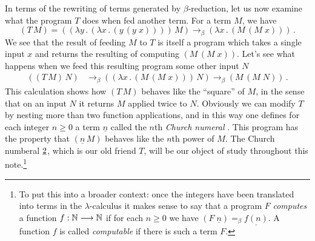 \documentclass[english,letter paper,12pt,reqno]{article}
\theoremstyle{example}
\numberwithin{equation}{section}
\begin{document}
In terms of the rewriting of terms generated by $\beta$-reduction, let us now examine what the program $T$ does when fed another term. For a term $M$, we have
\begin{equation}\label{eq:beta_reduc_dup}
(T \, M) = (( \lambda y \,.\, ( \lambda x \,.\, (y \,(y \; x))))\, M) \longrightarrow_\beta (\lambda x \, . \, (M \, (M \; x)))\,.
\end{equation}
We see that the result of feeding $M$ to $T$ is itself a program which takes a single input $x$ and returns the resulting of computing $(M \, (M \; x))$. Let's see what happens when we feed this resulting program some other input $N$
\begin{align*}
((T \, M) \, N) &\longrightarrow_\beta ((\lambda x \, . \, (M \, (M \; x))) \, N) \longrightarrow_\beta (M \, (M \; N))\,.
\end{align*}
This calculation shows how $(T \, M)$ behaves like the ``square'' of $M$, in the sense that on an input $N$ it returns $M$ applied twice to $N$. Obviously we can modify $T$ by nesting more than two function applications, and in this way one defines for each integer $n \ge 0$ a term $\underline{n}$ called the $n$th \emph{Church numeral} \cite[\S 3.2]{selinger}. This program has the property that $(\underline{n} \, M)$ behaves like the $n$th power of $M$. The Church numberal $\underline{2}$, which is our old friend $T$, will be our object of study throughout this note.\footnote{To put this into a broader context: once the integers have been translated into terms in the $\lambda$-calculus it makes sense to say that a program $F$ \emph{computes} a function $f: \mathbb{N} \longrightarrow \mathbb{N}$ if for each $n \ge 0$ we have $(F \; \underline{n}) =_\beta \underline{f(n)}$. A function $f$ is called \emph{computable} if there is such a term $F$.}
\\
\end{document}

